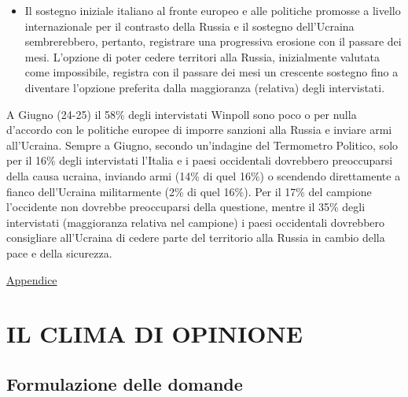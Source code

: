 \documentclass[
]{book}
\providecommand{\tightlist}{%
  \setlength{\itemsep}{0pt}\setlength{\parskip}{0pt}}
\begin{document}
\begin{itemize}
\tightlist
\item
  Il sostegno iniziale italiano al fronte europeo e alle politiche promosse a livello internazionale per il contrasto della Russia e il sostegno dell'Ucraina sembrerebbero, pertanto, registrare una progressiva erosione con il passare dei mesi. L'opzione di poter cedere territori alla Russia, inizialmente valutata come impossibile, registra con il passare dei mesi un crescente sostegno fino a diventare l'opzione preferita dalla maggioranza (relativa) degli intervistati.
\end{itemize}

A Giugno (24-25) il 58\% degli intervistati Winpoll sono poco o per nulla d'accordo con le politiche europee di imporre sanzioni alla Russia e inviare armi all'Ucraina.
Sempre a Giugno, secondo un'indagine del Termometro Politico, solo per il 16\% degli intervistati l'Italia e i paesi occidentali dovrebbero preoccuparsi della causa ucraina, inviando armi (14\% di quel 16\%) o scendendo direttamente a fianco dell'Ucraina militarmente (2\% di quel 16\%). Per il 17\% del campione l'occidente non dovrebbe preoccuparsi della questione, mentre il 35\% degli intervistati (maggioranza relativa nel campione) i paesi occidentali dovrebbero consigliare all'Ucraina di cedere parte del territorio alla Russia in cambio della pace e della sicurezza.

\href{https://github.com/LucianaFazio/Ucrania/blob/main/PDF_Appendice/VI.\%20Gli\%20effetti\%20del\%20conflitto\%20v.3.pdf}{Appendice}

\hypertarget{il-clima-di-opinione}{%
\chapter{IL CLIMA DI OPINIONE}\label{il-clima-di-opinione}}

\hypertarget{formulazione-delle-domande-5}{%
\section{Formulazione delle domande}\label{formulazione-delle-domande-5}}
\end{document}
